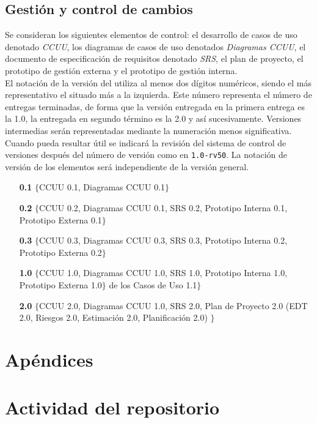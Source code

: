 \documentclass[11pt, a4paper, twoside, titlepage]{article}
\begin{document}
		\subsection{Gestión y control de cambios}
			Se consideran los siguientes elementos de control: el desarrollo de casos de uso denotado \textit{CCUU}, los diagramas de casos de uso denotados \textit{Diagramas CCUU}, el documento de especificación de requisitos \software denotado \textit{SRS}, el plan de proyecto, el prototipo de gestión externa y el prototipo de gestión interna.\\

			El notación de la versión del \software utiliza al menos dos dígitos numéricos, siendo el más representativo el situado más a la izquierda. Este número representa el número de entregas terminadas, de forma que la versión entregada en la primera entrega es la 1.0, la entregada en segundo término es la 2.0 y así sucesivamente. Versiones intermedias serán representadas mediante la numeración menos significativa. Cuando pueda resultar útil se indicará la revisión del sistema de control de versiones después del número de versión como en \verb|1.0-rv50|. La notación de versión de los elementos será independiente de la versión general.
		
		\begin{itemize}
			\item[\bfseries 0.1] $\{$CCUU 0.1, Diagramas CCUU 0.1$\}$
			\item[\bfseries 0.2] $\{$CCUU 0.2, Diagramas CCUU 0.1, SRS 0.2, Prototipo Interna 0.1, Prototipo Externa 0.1$\}$
			\item[\bfseries 0.3] $\{$CCUU 0.3, Diagramas CCUU 0.3, SRS 0.3, Prototipo Interna 0.2, Prototipo Externa 0.2$\}$
			\item[\bfseries 1.0] $\{$CCUU 1.0, Diagramas CCUU 1.0, SRS 1.0, Prototipo Interna 1.0, Prototipo Externa 1.0$\}$ de los Casos de Uso 1.1$\}$
			\item[\bfseries 2.0] $\{$CCUU 2.0, Diagramas CCUU 1.0, SRS 2.0, Plan de Proyecto 2.0 (EDT 2.0, Riesgos 2.0, Estimación 2.0, Planificación 2.0) $\}$
		\end{itemize}
		
	\newpage
	\section{Apéndices}
		\appendix
		\section{Actividad del repositorio}
			
		
		\newpage
		\normalsize
		\nocite{PSMAN}
		
		
\end{document}

